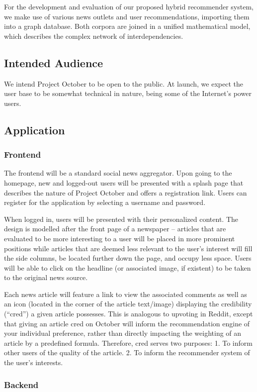 \documentclass[11pt,letterpaper]{article}
\begin{document}
For the development and evaluation of our proposed hybrid recommender system, we make use of various news outlets and user recommendations, importing them into a graph database.
Both corpora are joined in a unified mathematical model, which describes the complex network of interdependencies.

\subsection{Intended Audience}
We intend Project October to be open to the public.
At launch, we expect the user base to be somewhat technical in nature, being some of the Internet's power users.
\subsection{Application}
\subsubsection{Frontend}
The frontend will be a standard social news aggregator.
Upon going to the homepage, new and logged-out users will be presented with a splash page that describes the nature of Project October and offers a registration link.
Users can register for the application by selecting a username and password.

When logged in, users will be presented with their personalized content.
The design is modelled after the front page of a newspaper -- articles that are evaluated to be more interesting to a user will be placed in more prominent positions while articles that are deemed less relevant to the user's interest will fill the side columns, be located further down the page, and occupy less space.
Users will be able to click on the headline (or associated image, if existent) to be taken to the original news source.

Each news article will feature a link to view the associated comments as well as an icon (located in the corner of the article text/image) displaying the credibility (``cred'') a given article possesses.
This is analogous to upvoting in Reddit, except that giving an article cred on October will inform the recommendation engine of your individual preference, rather than directly impacting the weighting of an article by a predefined formula. Therefore, cred serves two purposes: 1. To inform other users of the quality of the article. 2. To inform the recommender system of the user's interests. 

\subsubsection{Backend}
\end{document}
